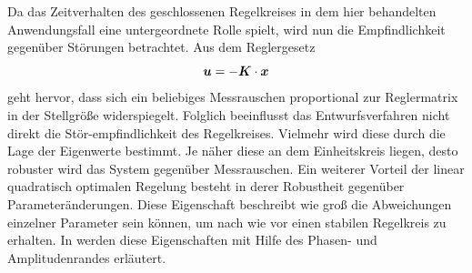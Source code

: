 Da das Zeitverhalten des geschlossenen Regelkreises in dem hier behandelten Anwendungsfall eine untergeordnete Rolle spielt, wird nun die Empfindlichkeit gegenüber Störungen betrachtet. Aus dem Reglergesetz
\begin{equation}
\boldsymbol{u} = -\boldsymbol{K}\cdot\boldsymbol{x}
\end{equation}
geht hervor, dass sich ein beliebiges Messrauschen proportional zur Reglermatrix in der Stellgröße widerspiegelt. Folglich beeinflusst das Entwurfsverfahren nicht direkt die Stör-empfindlichkeit des Regelkreises. Vielmehr wird diese durch die Lage der Eigenwerte bestimmt. Je näher diese an dem Einheitskreis liegen, desto robuster wird das System gegenüber Messrauschen.
Ein weiterer Vorteil der linear quadratisch optimalen Regelung besteht in derer Robustheit gegenüber Parameteränderungen. Diese Eigenschaft beschreibt wie groß die Abweichungen einzelner Parameter sein können, um nach wie vor einen stabilen Regelkreis zu erhalten. In \cite[S. 303 ff.]{LunzeRT2} werden diese Eigenschaften mit Hilfe des Phasen- und Amplitudenrandes erläutert.